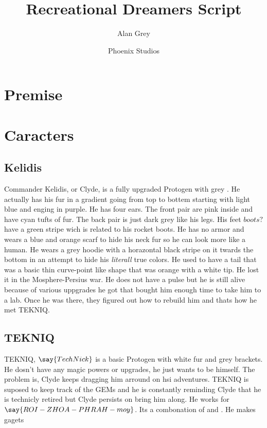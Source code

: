 \documentclass{article}
\title{Recreational Dreamers Script}
\author{Alan Grey}
\date{Phoenix Studios}
\begin{document}
\thispagestyle{fancy}
\maketitle
\tableofcontents

\section{Premise}

\section{Caracters}

\subsection{Kelidis}
Commander Kelidis, or Clyde, is a fully upgraded Protogen with grey . He actually
has his fur in a gradient going from top to bottem starting with light blue and enging in
purple. He has four ears. The front pair are pink inside and have cyan tufts of fur. The
back pair is just dark grey like his legs. His feet \(boots?\) have a green stripe wich is
related to his rocket boots. He has no armor and wears a blue and orange scarf to hide his
neck fur so he can look more like a human. He wears a grey hoodie with a horazontal black 
stripe on it twards the bottom in an attempt to hide his \emph{literall} true colors. He
used to have a tail that was a basic thin curve-point like shape that was orange with a white tip.
He lost it in the Mosphere-Persius war. He does not have a pulse but he is still alive
because of various uppgrades he got that bought him enough time to take him to a lab.
Once he was there, they figured out how to rebuild him and thats how he met TEKNIQ.

\subsection{TEKNIQ}
TEKNIQ, \(\say{Tech Nick}\) is a basic Protogen with white fur and grey brackets. 
He dosn't have any magic powers or upgrades, he just wants to be himself. The 
problem is, Clyde keeps dragging him arround on hsi adventures. TEKNIQ is suposed 
to keep track of the GEMs and he is constantly reminding Clyde that he is technicly 
retired but Clyde persists on bring him along. He works for 
\(\say{ROI-ZHOA-PHRAH-moy}\). Its a combonation of  and 
. He makes gagets
\end{document}
